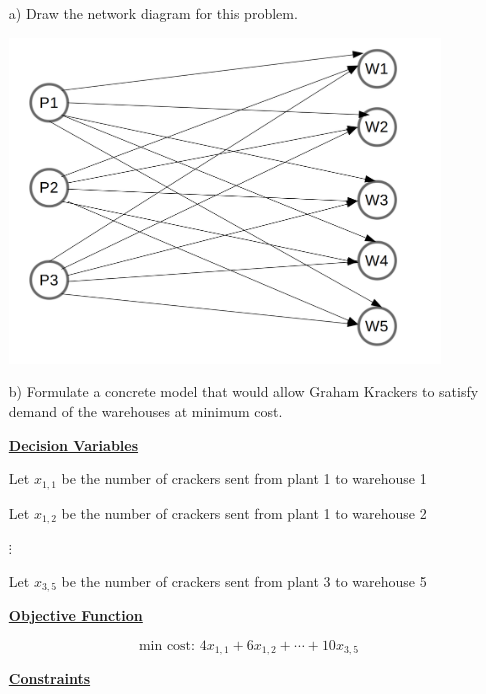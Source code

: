 \documentclass[11pt]{article}
\theoremstyle{definition}
\newcommand{\blu}{\color{blue}}
\begin{document}
\begin{enumerate}
\item[a)] Draw the network diagram for this problem.

\begin{center}
\includegraphics[width=0.9\textwidth]{Prob1.png}
\end{center}

\item[b)] Formulate a concrete model that would allow Graham Krackers to satisfy demand of the warehouses at minimum cost.

{\blu

\textbf{\underline{Decision Variables}}

Let $x_{1,1}$ be the number of crackers sent from plant 1 to warehouse 1

Let $x_{1,2}$ be the number of crackers sent from plant 1 to warehouse 2 

$\vdots$

Let $x_{3,5}$ be the number of crackers sent from plant 3 to warehouse 5

\textbf{\underline{Objective Function}}

\[
\text{min cost: } 4 x_{1,1} + 6 x_{1,2} + \cdots + 10 x_{3,5}
\]

\textbf{\underline{Constraints}}

}
\end{enumerate}
\end{document}
